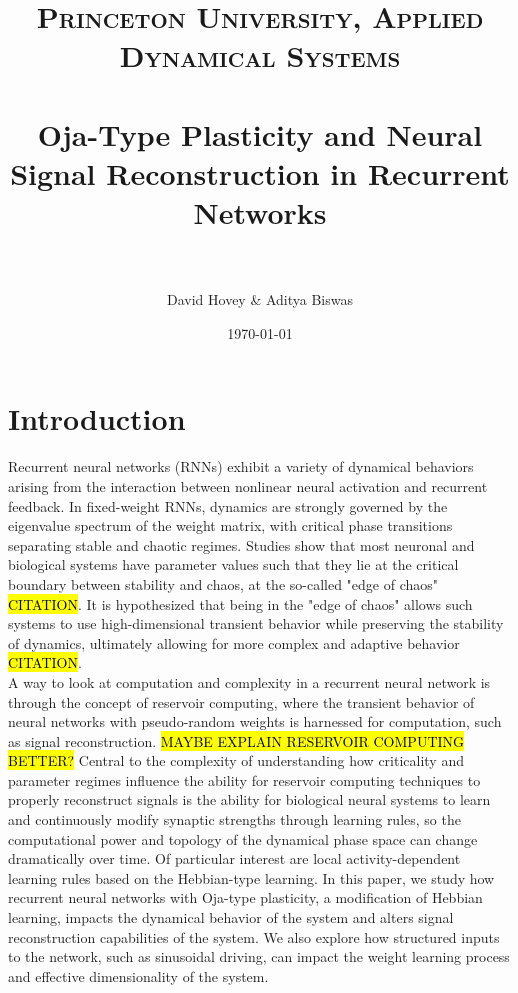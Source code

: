 \documentclass[paper=a4, fontsize=11pt]{scrartcl} %
\title{	
\normalfont \normalsize 
\textsc{Princeton University, Applied Dynamical Systems} \\ [25pt] %
\horrule{0.5pt} \\[0.4cm] %
\huge Oja-Type Plasticity and Neural Signal Reconstruction in Recurrent Networks  \\ %
\horrule{2pt} \\[0.5cm] %
}
\author{David Hovey \& Aditya Biswas} %
\date{\normalsize\today} %
\numberwithin{equation}{section} %
\numberwithin{figure}{section} %
\numberwithin{table}{section} %
\begin{document}
\maketitle %


\section{Introduction}
Recurrent neural networks (RNNs) exhibit a variety of dynamical behaviors arising from the interaction between nonlinear neural activation and recurrent feedback. In fixed-weight RNNs, dynamics are strongly governed by the eigenvalue spectrum of the weight matrix, with critical phase transitions separating stable and chaotic regimes. Studies show that most neuronal and biological systems have parameter values such that they lie at the critical boundary between stability and chaos, at the so-called "edge of chaos" \hl{CITATION}. It is hypothesized that being in the "edge of chaos" allows such systems to use high-dimensional transient behavior while preserving the stability of dynamics, ultimately allowing for more complex and adaptive behavior \hl{CITATION}.
\vspace{0.5cm}
\\
A way to look at computation and complexity in a recurrent neural network is through the concept of reservoir computing, where the transient behavior of neural networks with pseudo-random weights is harnessed for computation, such as signal reconstruction. \hl{MAYBE EXPLAIN RESERVOIR COMPUTING BETTER?} Central to the complexity of understanding how criticality and parameter regimes influence the ability for reservoir computing techniques to properly reconstruct signals is the ability for biological neural systems to learn and continuously modify synaptic strengths through learning rules, so the computational power and topology of the dynamical phase space can change dramatically over time. Of particular interest are local activity-dependent learning rules based on the Hebbian-type learning. In this paper, we study how recurrent neural networks with Oja-type plasticity, a modification of Hebbian learning, impacts the dynamical behavior of the system and alters signal reconstruction capabilities of the system. We also explore how structured inputs to the network, such as sinusoidal driving, can impact the weight learning process and effective dimensionality of the system.
\end{document}
